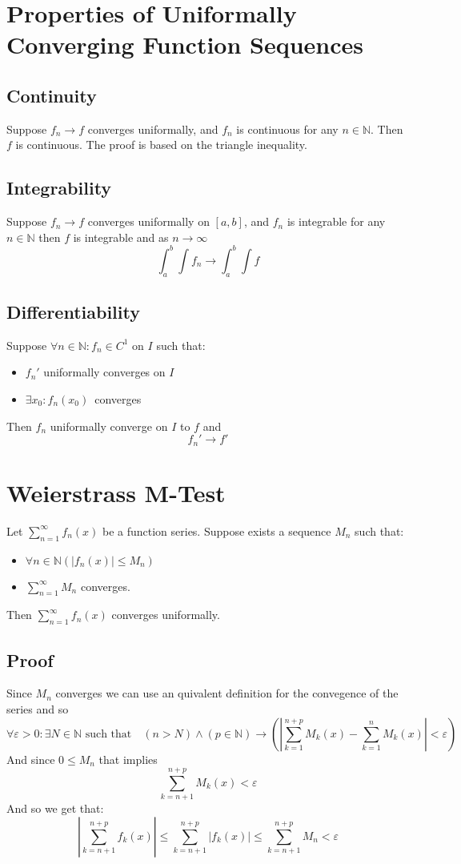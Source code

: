 \documentclass[11pt,a4paper]{article}
\theoremstyle{definition}
\theoremstyle{plain}
\newcommand{\N}{\mathbb{N}}
\begin{document}
	\newpage
	
	\section{Properties of Uniformally Converging Function Sequences}
		\subsection{Continuity}
			Suppose $f_n \to f$ converges uniformally, and $f_n$ is 
			continuous for any $n\in\N$. Then $f$ is continuous. 
			The proof is based on the triangle inequality.
	
		\subsection{Integrability}
			Suppose $f_n\to f$ converges uniformally on $[a,b]$, 
			and $f_n$ is integrable for any $n\in\N$ 
			then $f$ is integrable and as $n\to\infty$
			\[
				\int_a^b \int f_n\to\int_a^b \int f
			\]
			
		\subsection{Differentiability}
			Suppose $\forall n\in\N\colon f_n \in C^1$ on $I$ such that:
			\begin{itemize}
				\item  $f_n'$ uniformally converges on $I$
				\item $\exists x_0:f_n(x_0)\,$ converges
			\end{itemize}
			Then $f_n$ uniformally converge on $I$ to $f$ and
			\[
				f_n'\to f'
			\]
	
	\newpage
	\section{Weierstrass M-Test}
	Let $\sum_{n=1}^{\infty}{f_n(x)}$ be a function series. 
	Suppose exists a sequence $M_n$ such that:
	\begin{itemize}
    	\item $\forall n\in\N(|f_n(x)| \le M_n)$
    	\item $\sum_{n=1}^{\infty}{M_n}$ converges.
	\end{itemize}
	Then $\sum_{n=1}^\infty f_n(x)$ converges uniformally.
	\subsection{Proof}
		Since $M_n$ converges we can use an quivalent definition for the convegence 
		of the series and so
		\[
			\forall \varepsilon > 0 \colon \exists N\in\N \text{ such that} \quad 
			(n>N) \land (p\in\N) \rightarrow 
			\left(\left|\sum_{k=1}^{n+p}M_k(x) - 
			\sum_{k=1}^{n}M_k(x)\right|<\varepsilon\right)
		\]
	And since $0 \le M_n$ that implies
		\[
			\sum_{k=n+1}^{n+p}M_k(x)<\varepsilon
		\]
	And so we get that:
		\[
			\left|\sum_{k=n+1}^{n+p}{f_k(x)}\right|   \le 
			\sum_{k=n+1}^{n+p}{\left|f_k(x)\right|} \le 
			\sum_{k=n+1}^{n+p}{M_n} < \varepsilon
		\]
		
\end{document}
